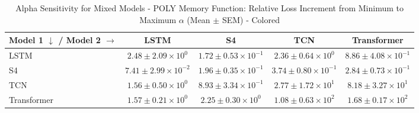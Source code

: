 
\begin{table}[h]
\centering
\caption{Alpha Sensitivity for Mixed Models - POLY Memory Function: Relative Loss Increment from Minimum to Maximum $\alpha$ (Mean $\pm$ SEM) - Colored}
\label{tab:mixed_alpha_sensitivity_poly_colored}
\begin{tabular}{lcccc}
\hline
Model 1 $\downarrow$ / Model 2 $\rightarrow$ & LSTM & S4 & TCN & Transformer \\
\hline
LSTM & \cellcolor{gray!20}$2.48 \pm 2.09 \times 10^{0}$ & \cellcolor{green!30!white}$1.72 \pm 0.53 \times 10^{-1}$ & \cellcolor{green!30!white}$2.36 \pm 0.64 \times 10^{0}$ & \cellcolor{green!30!white}$8.86 \pm 4.08 \times 10^{-1}$ \\
S4 & \cellcolor{green!30!white}$7.41 \pm 2.99 \times 10^{-2}$ & \cellcolor{gray!20}$1.96 \pm 0.35 \times 10^{-1}$ & \cellcolor{green!30!white}$3.74 \pm 0.80 \times 10^{-1}$ & \cellcolor{green!30!white}$2.84 \pm 0.73 \times 10^{-1}$ \\
TCN & \cellcolor{green!30!white}$1.56 \pm 0.50 \times 10^{0}$ & \cellcolor{green!30!white}$8.93 \pm 3.34 \times 10^{-1}$ & \cellcolor{gray!20}$2.77 \pm 1.72 \times 10^{1}$ & \cellcolor{green!9!white}$8.18 \pm 3.27 \times 10^{1}$ \\
Transformer & \cellcolor{green!30!white}$1.57 \pm 0.21 \times 10^{0}$ & \cellcolor{green!30!white}$2.25 \pm 0.30 \times 10^{0}$ & \cellcolor{red!6!white}$1.08 \pm 0.63 \times 10^{2}$ & \cellcolor{gray!20}$1.68 \pm 0.17 \times 10^{2}$ \\
\hline
\end{tabular}
\end{table}
